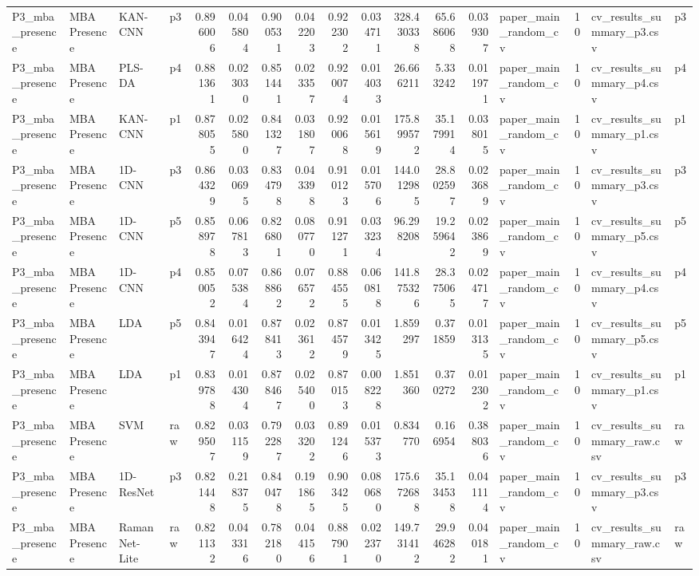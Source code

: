 \begin{tabular}{llllrrrrrrrrrlrll}
P3_mba_presence & MBA Presence & KAN-CNN & p3 & 0.896006 & 0.045804 & 0.900531 & 0.042203 & 0.922302 & 0.034711 & 328.430338 & 65.686068 & 0.039307 & paper_main_random_cv & 10 & cv_results_summary_p3.csv & p3 \\
P3_mba_presence & MBA Presence & PLS-DA & p4 & 0.881361 & 0.023030 & 0.851441 & 0.023357 & 0.920074 & 0.014033 & 26.666211 & 5.333242 & 0.011971 & paper_main_random_cv & 10 & cv_results_summary_p4.csv & p4 \\
P3_mba_presence & MBA Presence & KAN-CNN & p1 & 0.878055 & 0.025800 & 0.841327 & 0.031807 & 0.920068 & 0.015619 & 175.899572 & 35.179914 & 0.038015 & paper_main_random_cv & 10 & cv_results_summary_p1.csv & p1 \\
P3_mba_presence & MBA Presence & 1D-CNN & p3 & 0.864329 & 0.030695 & 0.834798 & 0.043398 & 0.910123 & 0.015706 & 144.012985 & 28.802597 & 0.023689 & paper_main_random_cv & 10 & cv_results_summary_p3.csv & p3 \\
P3_mba_presence & MBA Presence & 1D-CNN & p5 & 0.858978 & 0.067813 & 0.826801 & 0.080770 & 0.911271 & 0.033234 & 96.298208 & 19.259642 & 0.023869 & paper_main_random_cv & 10 & cv_results_summary_p5.csv & p5 \\
P3_mba_presence & MBA Presence & 1D-CNN & p4 & 0.850052 & 0.075384 & 0.868862 & 0.076572 & 0.884555 & 0.060818 & 141.875326 & 28.375065 & 0.024717 & paper_main_random_cv & 10 & cv_results_summary_p4.csv & p4 \\
P3_mba_presence & MBA Presence & LDA & p5 & 0.843947 & 0.016424 & 0.878413 & 0.023612 & 0.874579 & 0.013425 & 1.859297 & 0.371859 & 0.013135 & paper_main_random_cv & 10 & cv_results_summary_p5.csv & p5 \\
P3_mba_presence & MBA Presence & LDA & p1 & 0.839788 & 0.014304 & 0.878467 & 0.025400 & 0.870153 & 0.008228 & 1.851360 & 0.370272 & 0.012302 & paper_main_random_cv & 10 & cv_results_summary_p1.csv & p1 \\
P3_mba_presence & MBA Presence & SVM & raw & 0.829507 & 0.031159 & 0.792287 & 0.033202 & 0.891246 & 0.015373 & 0.834770 & 0.166954 & 0.388036 & paper_main_random_cv & 10 & cv_results_summary_raw.csv & raw \\
P3_mba_presence & MBA Presence & 1D-ResNet & p3 & 0.821448 & 0.218375 & 0.840478 & 0.191865 & 0.903425 & 0.080680 & 175.672688 & 35.134538 & 0.041114 & paper_main_random_cv & 10 & cv_results_summary_p3.csv & p3 \\
P3_mba_presence & MBA Presence & RamanNet-Lite & raw & 0.821132 & 0.043316 & 0.782180 & 0.044156 & 0.887901 & 0.022370 & 149.731412 & 29.946282 & 0.040181 & paper_main_random_cv & 10 & cv_results_summary_raw.csv & raw \\

\end{tabular}

